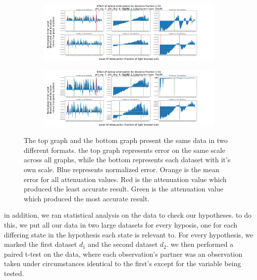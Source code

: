 \documentclass{article}
\begin{document}
\begin{figure}[H]
\centering
\begin{subfigure}[b]{1\textwidth}
\includegraphics[width=1\linewidth]{SharedyExample.png}
\label{fig:Ng1}
\end{subfigure}
\begin{subfigure}[b]{1\textwidth}
\includegraphics[width=1\linewidth]{ZoomedyExample.png}
\label{fig:Ng2}
\end{subfigure}

\caption{\label{fig:Data}The top graph and the bottom graph present the same data in two different formats. the top graph represents error on the same scale across all graphs, while the bottom represents each dataset with it's own scale. Blue represents normalized error. Orange is the mean error for all attenuation values. Red is the attenuation value which produced the least accurate result. Green is the attenuation value which produced the most accurate result.}

\end{figure}

in addition, we ran statistical analysis on the data to check our hypotheses. to do this, we put all our data in two large datasets for every hyposis, one for each differing state in the hypothesis each state is relevant to. For every hypothesis, we marked the first dataset $d_{1}$ and the second dataset $d_{2}$. we then performed a paired t-test on the data, where each observation's partner was an observation taken under circumstances identical to the first's except for the variable being tested. 
\end{document}
